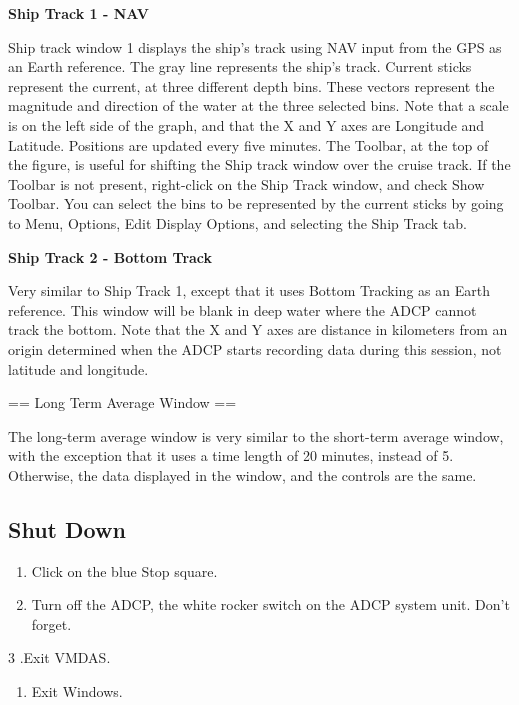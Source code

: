\documentclass[]{book}
\providecommand{\tightlist}{%
  \setlength{\itemsep}{0pt}\setlength{\parskip}{0pt}}
\theoremstyle{definition}
\theoremstyle{definition}
\theoremstyle{definition}
\theoremstyle{remark}
\begin{document}
\textbf{Ship Track 1 - NAV}

Ship track window 1 displays the ship's track using NAV input from the
GPS as an Earth reference. The gray line represents the ship's track.
Current sticks represent the current, at three different depth bins.
These vectors represent the magnitude and direction of the water at the
three selected bins. Note that a scale is on the left side of the graph,
and that the X and Y axes are Longitude and Latitude. Positions are
updated every five minutes. The Toolbar, at the top of the figure, is
useful for shifting the Ship track window over the cruise track. If the
Toolbar is not present, right-click on the Ship Track window, and check
Show Toolbar. You can select the bins to be represented by the current
sticks by going to Menu, Options, Edit Display Options, and selecting
the Ship Track tab.

\textbf{Ship Track 2 - Bottom Track}

Very similar to Ship Track 1, except that it uses Bottom Tracking as an
Earth reference. This window will be blank in deep water where the ADCP
cannot track the bottom. Note that the X and Y axes are distance in
kilometers from an origin determined when the ADCP starts recording data
during this session, not latitude and longitude.

== Long Term Average Window ==

The long-term average window is very similar to the short-term average
window, with the exception that it uses a time length of 20 minutes,
instead of 5. Otherwise, the data displayed in the window, and the
controls are the same.

\subsection{Shut Down}\label{shut-down}

\begin{enumerate}
\def\labelenumi{\arabic{enumi}.}
\item
  Click on the blue Stop square.
\item
  Turn off the ADCP, the white rocker switch on the ADCP system unit.
  Don't forget.
\end{enumerate}

3 .Exit VMDAS.

\begin{enumerate}
\def\labelenumi{\arabic{enumi}.}
\setcounter{enumi}{3}
\tightlist
\item
  Exit Windows.
\end{enumerate}
\end{document}
